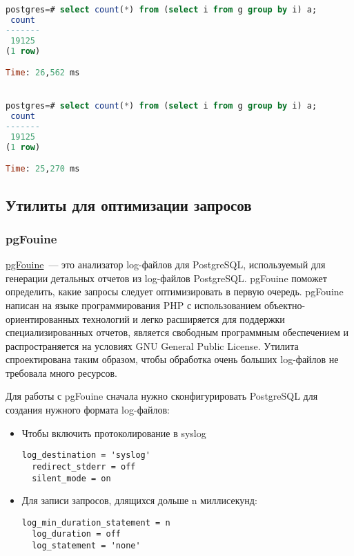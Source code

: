 \begin{lstlisting}[language=SQL,label=lst:sql_performance4,caption=GROUP BY]
postgres=# select count(*) from (select i from g group by i) a;
 count
-------
 19125
(1 row)

Time: 26,562 ms


postgres=# select count(*) from (select i from g group by i) a;
 count
-------
 19125
(1 row)

Time: 25,270 ms

\end{lstlisting}


\subsection{Утилиты для оптимизации запросов}

\subsubsection{pgFouine}

\href{http://pgfouine.projects.pgfoundry.org/}{pgFouine}~--- это анализатор log-файлов для PostgreSQL, используемый для генерации детальных отчетов из log-файлов PostgreSQL. pgFouine поможет определить, какие запросы следует оптимизировать в первую очередь. pgFouine написан на языке программирования PHP с использованием объектно-ориентированных технологий и легко расширяется для поддержки специализированных отчетов, является свободным программным обеспечением и распространяется на условиях GNU General Public License. Утилита спроектирована таким образом, чтобы обработка очень больших log-файлов не требовала много ресурсов.

Для работы с pgFouine сначала нужно сконфигурировать PostgreSQL для создания нужного формата log-файлов:

\begin{itemize}
  \item Чтобы включить протоколирование в syslog
  \begin{lstlisting}[label=lst:sql_performance5,caption=pgFouine]
  log_destination = 'syslog'
  redirect_stderr = off
  silent_mode = on
  \end{lstlisting}
  \item Для записи запросов, длящихся дольше n миллисекунд:
  \begin{lstlisting}[label=lst:sql_performance6,caption=pgFouine]
  log_min_duration_statement = n
  log_duration = off
  log_statement = 'none'
  \end{lstlisting}
\end{itemize}


